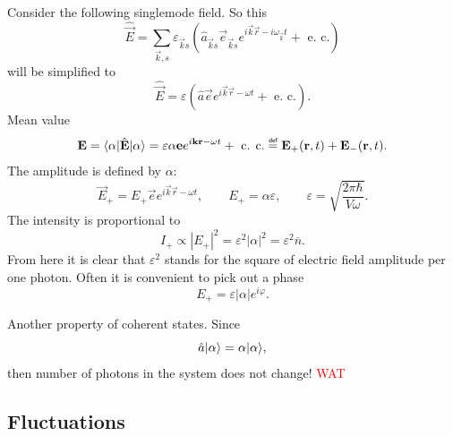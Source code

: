 Consider the following singlemode field. So this
\begin{equation}
	\hat{\vec{E}} = \sum_{\vec{k},s} \varepsilon_{\vec{k}s} \left( \hat{a}_{\vec{k}s} \vec{e}_{\vec{k}s} e^{i \vec{k} \vec{r} - i \omega_{\vec{k}}t} + \text{ e. c.} \right)
\end{equation}
will be simplified to
\begin{equation}
	\hat{\vec{E}} = \varepsilon \left( \hat{a} \vec{e} e^{i \vec{k} \vec{r} - \omega t} + \text{ e. c.}\right).
\end{equation}
Mean value
\begin{equation}
	\vec{E} = \bra{\alpha} \hat{\vec{E}} \ket{\alpha} = \varepsilon \alpha \vec{e} e^{i \vec{k} \vec{r} - \omega t} + \text{ c. c.} \myeq \vec{E}_+(\vec{r},t) + \vec{E}_-(\vec{r},t).
\end{equation}
The amplitude is defined by $\alpha$:
\begin{equation}
	\vec{E}_+ = E_+ \vec{e} e^{i \vec{k} \vec{r} - \omega t}, \qquad E_+ = \alpha \varepsilon, \qquad \varepsilon = \sqrt{\frac{2 \pi \hbar}{V \omega}}.
\end{equation}
The intensity is proportional to
\begin{equation}
	I_+ \propto \left|E_+\right|^2 = \varepsilon^2 \left|\alpha\right|^2 = \varepsilon^2 \overline{n}.
\end{equation}
From here it is clear that $\varepsilon^2$ stands for the square of electric field amplitude per one photon. Often it is convenient to pick out a phase
\begin{equation}
	E_+ = \varepsilon \left|\alpha\right| e^{i \varphi}.
\end{equation}

Another property of coherent states. Since
\begin{equation}
	\hat{a} \lvert\alpha\rangle = \alpha \lvert\alpha\rangle,
\end{equation}
then number of photons in the system does not change! {\textcolor{red}{WAT}}


\subsection{Fluctuations}

